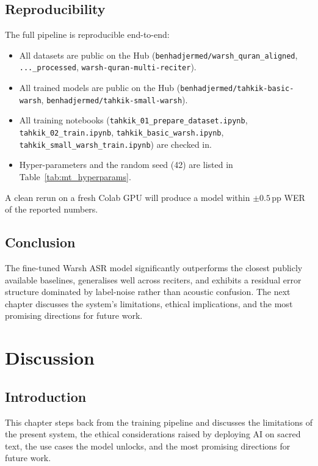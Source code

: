 \section{Reproducibility}

The full pipeline is reproducible end-to-end:

\begin{itemize}
  \item All datasets are public on the Hub
        (\texttt{benhadjermed/warsh\_quran\_aligned},
        \texttt{...\_processed},
        \texttt{warsh-quran-multi-reciter}).
  \item All trained models are public on the Hub
        (\texttt{benhadjermed/tahkik-basic-warsh},
        \texttt{benhadjermed/tahkik-small-warsh}).
  \item All training notebooks
        (\texttt{tahkik\_01\_prepare\_dataset.ipynb},
        \texttt{tahkik\_02\_train.ipynb},
        \texttt{tahkik\_basic\_warsh.ipynb},
        \texttt{tahkik\_small\_warsh\_train.ipynb}) are checked in.
  \item Hyper-parameters and the random seed (42) are listed in
        Table~\ref{tab:mt_hyperparams}.
\end{itemize}

A clean rerun on a fresh Colab GPU will produce a model within
$\pm 0.5$\,pp WER of the reported numbers.

\section{Conclusion}
The fine-tuned Warsh ASR model significantly outperforms the closest
publicly available baselines, generalises well across reciters, and
exhibits a residual error structure dominated by label-noise rather
than acoustic confusion. The next chapter discusses the system's
limitations, ethical implications, and the most promising directions
for future work.

\chapter{Discussion}
\label{ch:mt_discussion}

\section{Introduction}
This chapter steps back from the training pipeline and discusses the
limitations of the present system, the ethical considerations raised by
deploying AI on sacred text, the use cases the model unlocks, and the
most promising directions for future work.

